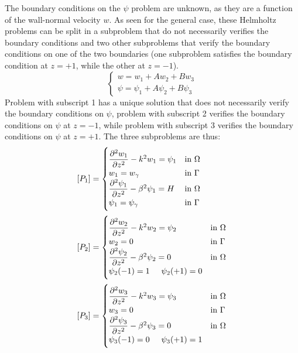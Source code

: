 The boundary conditions on the $\psi$ problem are unknown, as they are a function of the wall-normal velocity $w$. As seen for the general case, these Helmholtz problems can be split in a subproblem that do not necessarily verifies the boundary conditions and two other subproblems that verify the boundary conditions on one of the two boundaries (one subproblem satisfies the boundary condition at $z=+1$, while the other at $z=-1$).
\begin{equation}
\begin{cases}
w=w_1+Aw_2+Bw_3 \\
\psi=\psi_1+A\psi_2+B\psi_3
\end{cases}
\end{equation}
Problem with subscript 1 has a unique solution that does not necessarily verify the boundary conditions on $\psi$, problem with subscript 2 verifies the boundary conditions on $\psi$ at $z=-1$, while problem with subscript 3 verifies the boundary conditions on $\psi$ at $z=+1$. The three subproblems are thus:
\begin{equation}
\begin{array}{l}
[P_1]=
\begin{cases}
\dfrac{\partial^2 w_1}{\partial z^2}-k^2w_1=\psi_1 & \textnormal{in }\Omega \\
w_1=w_\gamma & \textnormal{in }\Gamma \\
\dfrac{\partial^2 \psi_1}{\partial z^2}-\beta^2 \psi_1 =H & \textnormal{in } \Omega \\
\psi_1=\psi_\gamma & \textnormal{in }\Gamma \\
\end{cases}\\[9ex]
[P_2]=
\begin{cases}
\dfrac{\partial^2 w_2}{\partial z^2}-k^2w_2=\psi_2 & \textnormal{in }\Omega \\
w_2=0 & \textnormal{in }\Gamma \\
\dfrac{\partial^2 \psi_2}{\partial z^2}-\beta^2 \psi_2 =0 & \textnormal{in } \Omega \\
\psi_2(-1)=1 \hspace{0.5cm} \psi_2(+1)=0
\end{cases}\\[9ex]
[P_3]=
\begin{cases}
\dfrac{\partial^2 w_3}{\partial z^2}-k^2w_3=\psi_3 & \textnormal{in }\Omega \\
w_3=0 & \textnormal{in }\Gamma \\
\dfrac{\partial^2 \psi_3}{\partial z^2}-\beta^2 \psi_3 =0 & \textnormal{in } \Omega \\
\psi_3(-1)=0 \hspace{0.5cm} \psi_3(+1)=1
\end{cases}
\end{array}
\end{equation}
